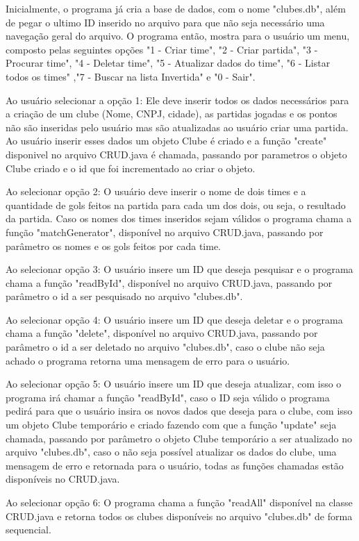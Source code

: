 \documentclass[12pt]{article}
\begin{document}
Inicialmente, o programa já cria a base de dados, com o nome "clubes.db", além de pegar o ultimo ID inserido no arquivo para que não seja necessário uma navegação geral do arquivo. O programa então, mostra para o usuário um menu, composto pelas seguintes opções "1 - Criar time", "2 - Criar partida", "3 - Procurar time", "4 - Deletar time", "5 - Atualizar dados do time", "6 - Listar todos os times" ,"7 - Buscar na lista Invertida" e "0 - Sair". 

Ao usuário selecionar a opção 1: Ele deve inserir todos os dados necessários para a criação de um clube (Nome, CNPJ, cidade), as partidas jogadas e os pontos não são inseridas pelo usuário mas são atualizadas ao usuário criar uma partida. Ao usuário inserir esses dados um objeto Clube é criado e a função "create" disponivel no arquivo CRUD.java é chamada, passando por parametros o objeto Clube criado e o id que foi incrementado ao criar o objeto.

Ao selecionar opção 2: O usuário deve inserir o nome de dois times e a quantidade de gols feitos na partida para cada um dos dois, ou seja, o resultado da partida. Caso os nomes dos times inseridos sejam válidos o programa chama a função "matchGenerator", disponível no arquivo CRUD.java, passando por parâmetro os nomes e os gols feitos por cada time.

Ao selecionar opção 3: O usuário insere um ID que deseja pesquisar e o programa chama a função "readById", disponível no arquivo CRUD.java, passando por parâmetro o id a ser pesquisado no arquivo "clubes.db".

Ao selecionar opção 4: O usuário insere um ID que deseja deletar e o programa chama a função "delete", disponível no arquivo CRUD.java, passando por parâmetro o id a ser deletado no arquivo "clubes.db", caso o clube não seja achado o programa retorna uma mensagem de erro para o usuário.

Ao selecionar opção 5: O usuário insere um ID que deseja atualizar, com isso o programa irá chamar a função "readById", caso o ID seja válido o programa pedirá para que o usuário insira os novos dados que deseja para o clube, com isso um objeto Clube temporário e criado fazendo com que a função "update" seja chamada, passando por parâmetro o objeto Clube temporário a ser atualizado no arquivo "clubes.db", caso o não seja possível atualizar os dados do clube, uma mensagem de erro e retornada para o usuário, todas as funções chamadas estão disponíveis no CRUD.java.

Ao selecionar opção 6: O programa chama a função "readAll" disponível na classe CRUD.java e retorna todos os clubes disponíveis no arquivo "clubes.db" de forma sequencial.
\end{document}
